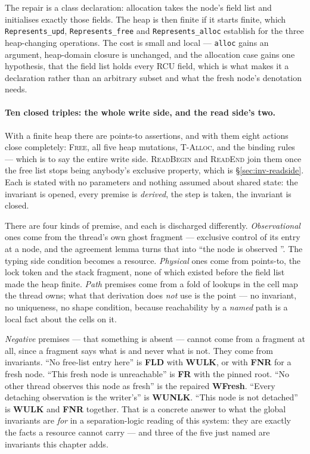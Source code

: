 The repair is a class declaration: allocation takes the node's field list and
initialises exactly those fields.  The heap is then finite if it starts finite,
which \texttt{Represents\_upd}, \texttt{Represents\_free} and
\texttt{Represents\_alloc} establish for the three heap-changing operations.
The cost is small and local --- \texttt{alloc} gains an argument, heap-domain
closure is unchanged, and the allocation case gains one hypothesis, that the
field list holds every RCU field, which is what makes it a declaration rather
than an arbitrary subset and what the fresh node's denotation needs.

\paragraph{Ten closed triples: the whole write side, and the read side's two.}
With a finite heap there are points-to assertions, and with them eight actions
close completely: \textsc{Free}, all five heap mutations, \textsc{T-Alloc}, and
the binding rules --- which is to say the entire write side.  \textsc{ReadBegin}
and \textsc{ReadEnd} join them once the free list stops being anybody's
exclusive property, which is \S\ref{sec:inv-readside}.  Each is stated with no
parameters and nothing assumed about shared state: the invariant is opened,
every premise is \emph{derived}, the step is taken, the invariant is closed.

There are four kinds of premise, and each is discharged differently.
\emph{Observational} ones come from the thread's own ghost fragment ---
exclusive control of its entry at a node, and the agreement lemma turns that
into ``the node is observed \frbl{}''.  The typing side condition becomes a
resource.  \emph{Physical} ones come from points-to, the lock token and the
stack fragment, none of which existed before the field list made the heap
finite.  \emph{Path} premises come from a fold of lookups in the cell map the
thread owns; what that derivation does \emph{not} use is the point ---
no invariant, no uniqueness, no shape condition, because reachability by a
\emph{named} path is a local fact about the cells on it.

\emph{Negative} premises --- that something is absent --- cannot come from a
fragment at all, since a fragment says what is and never what is not.  They come
from invariants.  ``No free-list entry here'' is \textbf{FLD} with
\textbf{WULK}, or with \textbf{FNR} for a fresh node.  ``This fresh node is
unreachable'' is \textbf{FR} with the pinned root.  ``No other thread observes
this node as fresh'' is the repaired \textbf{WFresh}.  ``Every detaching
observation is the writer's'' is \textbf{WUNLK}.  ``This node is not detached''
is \textbf{WULK} and \textbf{FNR} together.  That is a concrete answer to what
the global invariants are \emph{for} in a separation-logic reading of this
system: they are exactly the facts a resource cannot carry --- and three of the
five just named are invariants this chapter adds.

